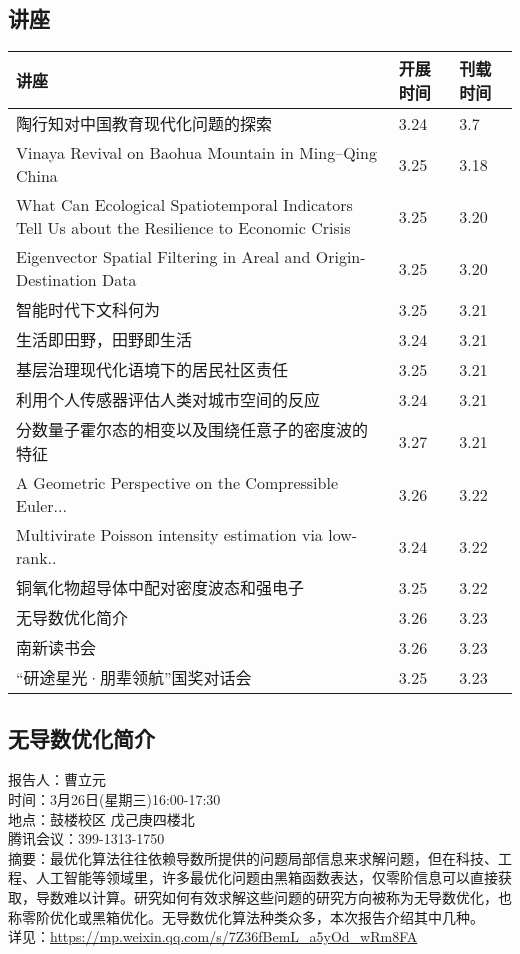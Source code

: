 \documentclass[letterpaper, 12pt]{article}
\begin{document}
\begin{multicols}{2}
\pagebreak

\section{讲座}
\begin{tabular}{|>{\centering\arraybackslash}m{}|m{}|m{}|}
    \hline
    讲座 & 开展时间 & 刊载时间\\
    \hline\hline
    陶行知对中国教育现代化问题的探索 & 3.24 & 3.7\\\hline
    Vinaya Revival on Baohua Mountain in Ming–Qing China & 3.25 & 3.18 \\\hline
    What Can Ecological Spatiotemporal Indicators Tell Us about the Resilience to Economic Crisis & 3.25 & 3.20\\\hline
    Eigenvector Spatial Filtering in Areal and Origin-Destination Data & 3.25 & 3.20\\\hline
    智能时代下文科何为 & 3.25 & 3.21\\\hline
    生活即田野，田野即生活 & 3.24 & 3.21\\\hline
    基层治理现代化语境下的居民社区责任 & 3.25 & 3.21\\\hline
    利用个人传感器评估人类对城市空间的反应 & 3.24 & 3.21\\\hline
    分数量子霍尔态的相变以及围绕任意子的密度波的特征 & 3.27 & 3.21\\\hline
    A Geometric Perspective on the Compressible Euler... & 3.26 & 3.22\\\hline
    Multivirate Poisson intensity estimation via low-rank.. & 3.24 & 3.22\\\hline
    铜氧化物超导体中配对密度波态和强电子 & 3.25 & 3.22\\\hline
    无导数优化简介 & 3.26 & 3.23\\\hline
    南新读书会 & 3.26 & 3.23\\\hline
    “研途星光·朋辈领航”国奖对话会 & 3.25 & 3.23\\\hline
\end{tabular}
\subsection{无导数优化简介}
报告人：曹立元
\\时间：3月26日(星期三)16:00-17:30
\\地点：鼓楼校区 戊己庚四楼北
\\腾讯会议：399-1313-1750
\\摘要：最优化算法往往依赖导数所提供的问题局部信息来求解问题，但在科技、工程、人工智能等领域里，许多最优化问题由黑箱函数表达，仅零阶信息可以直接获取，导数难以计算。研究如何有效求解这些问题的研究方向被称为无导数优化，也称零阶优化或黑箱优化。无导数优化算法种类众多，本次报告介绍其中几种。
\\详见：\url{https://mp.weixin.qq.com/s/7Z36fBemL_a5yOd_wRm8FA}


\end{multicols}
\end{document}
